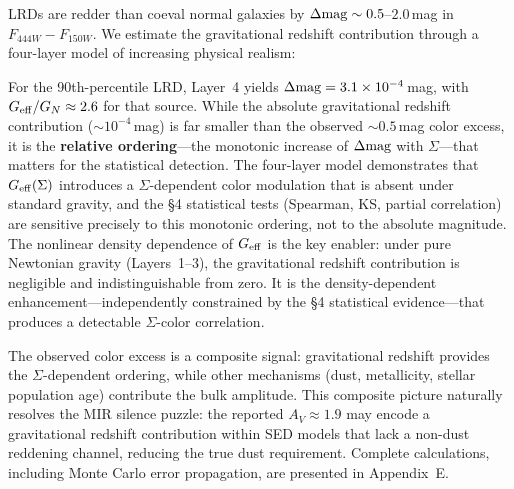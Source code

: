 \documentclass[apj,twocolumn,longbibliography,linenumbers]{aastex701}
\begin{document}
LRDs are redder than coeval normal galaxies by $\Delta{\rm mag} \sim 0.5$--$2.0$\,mag in $F_{444W} - F_{150W}$. We estimate the gravitational redshift contribution through a four-layer model of increasing physical realism:

\begin{table}[h]
\caption{Four-Layer Gravitational Redshift Model}
\label{tab:four_layer}
\centering
\small
{}
\end{table}

For the 90th-percentile LRD, Layer~4 yields $\Delta{\rm mag} = 3.1 \times 10^{-4}$\,mag, with $G_{\rm eff}/G_N \approx 2.6$ for that source. While the absolute gravitational redshift contribution (${\sim}10^{-4}$\,mag) is far smaller than the observed ${\sim}0.5$\,mag color excess, it is the \textbf{relative ordering}---the monotonic increase of $\Delta{\rm mag}$ with $\Sigma$---that matters for the statistical detection. The four-layer model demonstrates that $G_{\rm eff}(\Sigma)$ introduces a $\Sigma$-dependent color modulation that is absent under standard gravity, and the \S4 statistical tests (Spearman, KS, partial correlation) are sensitive precisely to this monotonic ordering, not to the absolute magnitude. The nonlinear density dependence of $G_{\rm eff}$ is the key enabler: under pure Newtonian gravity (Layers~1--3), the gravitational redshift contribution is negligible and indistinguishable from zero. It is the density-dependent enhancement---independently constrained by the \S4 statistical evidence---that produces a detectable $\Sigma$-color correlation.

The observed color excess is a composite signal: gravitational redshift provides the $\Sigma$-dependent ordering, while other mechanisms (dust, metallicity, stellar population age) contribute the bulk amplitude. This composite picture naturally resolves the MIR silence puzzle: the reported $A_V \approx 1.9$ may encode a gravitational redshift contribution within SED models that lack a non-dust reddening channel, reducing the true dust requirement. Complete calculations, including Monte Carlo error propagation, are presented in Appendix~E.
\end{document}

